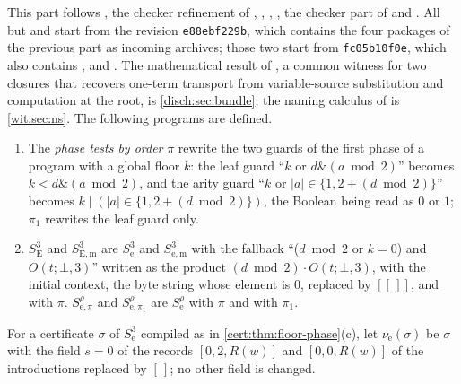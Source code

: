 This part follows , the checker refinement of
, , ,
, the checker part of  and
. All but  and
 start from the revision \texttt{e88ebf229b}, which contains the
four packages of the previous part as incoming archives; those two start from
\texttt{fc05b10f0e}, which also contains
,  and . The mathematical
result of , a common witness for two closures that recovers
one-term transport from variable-source substitution and computation at the root, is
\cref{disch:sec:bundle}; the naming calculus of  is
\cref{wit:sec:ns}. The following programs are defined.
\begin{enumerate}[label=(\roman*),start=11]
\item The \emph{phase tests by order} $\pi$ rewrite the two guards of the first phase of
a program with a global floor $k$: the leaf guard ``$k$ or $d\mathbin{\&}(a\bmod 2)$''
becomes $k<d\mathbin{\&}(a\bmod 2)$, and the arity guard ``$k$ or
$\lvert a\rvert\in\{1,2+(d\bmod 2)\}$'' becomes $k\mathbin{|}(\lvert a\rvert\in
\{1,2+(d\bmod 2)\})$, the Boolean being read as $0$ or $1$; $\pi_1$ rewrites the leaf
guard only.
\item $S^{3}_{\mathrm E}$ and $S^{3}_{\mathrm{E,m}}$ are $S^{3}_{\mathrm e}$ and
$S^{3}_{\mathrm{e,m}}$ with the fallback ``($d\bmod 2$ or $k=0$) and $O(t;\bot,3)$''
written as the product $(d\bmod 2)\cdot O(t;\bot,3)$, with the initial context, the byte
string whose element is $0$, replaced by $[[\,]]$, and with $\pi$.
$S^{\rho}_{\mathrm e,\pi}$ and $S^{\rho}_{\mathrm e,\pi_1}$ are $S^{\rho}_{\mathrm e}$
with $\pi$ and with $\pi_1$.
\end{enumerate}
For a certificate $\sigma$ of $S^{3}_{\mathrm e}$ compiled as in
\cref{cert:thm:floor-phase}(c), let $\nu_{\mathrm e}(\sigma)$ be $\sigma$ with the field
$s=0$ of the records $[0,2,R(w)]$ and $[0,0,R(w)]$ of the introductions replaced by
$[\,]$; no other field is changed.

